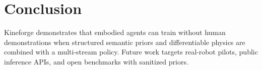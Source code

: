 \documentclass[11pt,a4paper]{article}
\begin{document}
\section{Conclusion}
\label{sec:conclusion}

Kineforge demonstrates that embodied agents can train without human demonstrations when structured semantic priors and differentiable physics are combined with a multi-stream policy. Future work targets real-robot pilots, public inference APIs, and open benchmarks with sanitized priors.

\FloatBarrier
\clearpage



\clearpage
\appendix

\end{document}
